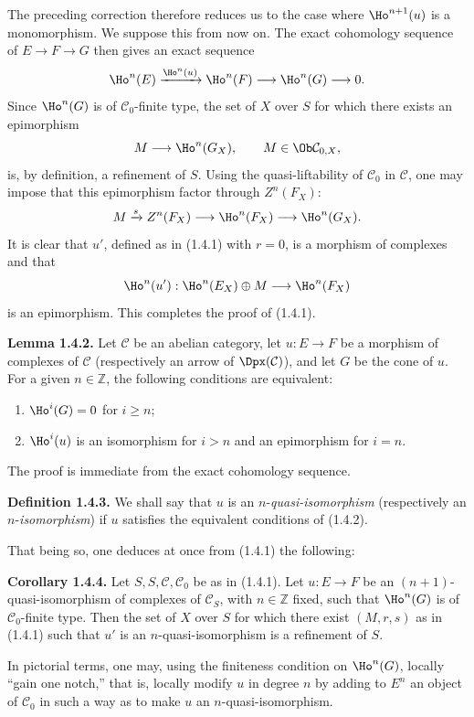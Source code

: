 The preceding correction therefore reduces us to the case where \(\Ho^{n+1}(u)\) is a monomorphism. We suppose this from now on. The exact cohomology sequence of \(E\to F\to G\) then gives an exact sequence
\[
  \Ho^n(E)\xrightarrow{\Ho^n(u)}
  \Ho^n(F)\longrightarrow \Ho^n(G)\longrightarrow 0.
\]
Since \(\Ho^n(G)\) is of \(\mathcal C_0\)-finite type, the set of \(X\) over \(S\) for which there exists an epimorphism
\[
  M\longrightarrow \Ho^n(G_X),\qquad M\in\Ob\mathcal C_{0,X},
\]
is, by definition, a refinement of \(S\). Using the quasi-liftability of \(\mathcal C_0\) in \(\mathcal C\), one may impose that this epimorphism factor through \(Z^n(F_X)\):
\[
  M\xrightarrow{s}Z^n(F_X)\longrightarrow \Ho^n(F_X)\longrightarrow \Ho^n(G_X).
\]
It is clear that \(u'\), defined as in (1.4.1) with \(r=0\), is a morphism of complexes and that
\[
  \Ho^n(u'):\Ho^n(E_X)\oplus M\longrightarrow \Ho^n(F_X)
\]
is an epimorphism. This completes the proof of (1.4.1).

\textbf{Lemma 1.4.2.} Let \(\mathcal C\) be an abelian category, let \(u:E\to F\) be a morphism of complexes of \(\mathcal C\) (respectively an arrow of \(\Dpx(\mathcal C)\)), and let \(G\) be the cone of \(u\). For a given \(n\in\mathbb Z\), the following conditions are equivalent:
\begin{enumerate}[label=(\roman*)]
\item \(\Ho^i(G)=0\) for \(i\geq n\);
\item \(\Ho^i(u)\) is an isomorphism for \(i>n\) and an epimorphism for \(i=n\).
\end{enumerate}
The proof is immediate from the exact cohomology sequence.

\textbf{Definition 1.4.3.} We shall say that \(u\) is an \(n\)-\emph{quasi-isomorphism} (respectively an \(n\)-\emph{isomorphism}) if \(u\) satisfies the equivalent conditions of (1.4.2).

That being so, one deduces at once from (1.4.1) the following:

\textbf{Corollary 1.4.4.} Let \(S,S,\mathcal C,\mathcal C_0\) be as in (1.4.1). Let \(u:E\to F\) be an \((n+1)\)-quasi-isomorphism of complexes of \(\mathcal C_S\), with \(n\in\mathbb Z\) fixed, such that \(\Ho^n(G)\) is of \(\mathcal C_0\)-finite type. Then the set of \(X\) over \(S\) for which there exist \((M,r,s)\) as in (1.4.1) such that \(u'\) is an \(n\)-quasi-isomorphism is a refinement of \(S\).

In pictorial terms, one may, using the finiteness condition on \(\Ho^n(G)\), locally ``gain one notch,'' that is, locally modify \(u\) in degree \(n\) by adding to \(E^n\) an object of \(\mathcal C_0\) in such a way as to make \(u\) an \(n\)-quasi-isomorphism.

